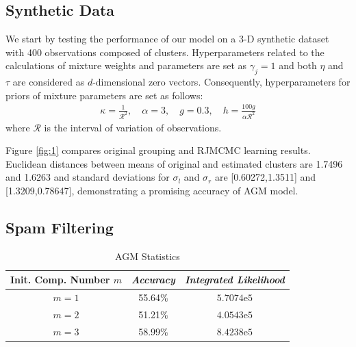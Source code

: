 \documentclass[conference]{IEEEtran}
\begin{document}
\subsection{Synthetic Data}

We start by testing the performance of our model on a 3-D synthetic dataset with 400 observations composed of clusters. Hyperparameters related to the calculations of mixture weights and parameters are set as $\gamma_j = 1$ and both $\eta$ and $\tau$ are considered as $d$-dimensional zero vectors. Consequently, hyperparameters for priors of mixture parameters are set as follows\cite{b13}:
\begin{align}
\kappa = \frac{1}{\mathcal{R}^2}, \quad \alpha = 3, \quad g=0.3, \quad h=\frac{100g}{\alpha\mathcal{R}^2}
\label{eq:hypers}
\end{align}
where $\mathcal{R}$ is the interval of variation of observations.

Figure \ref{fig:1} compares original grouping and RJMCMC learning results. Euclidean distances between means of original and estimated clusters are 1.7496 and 1.6263 and standard deviations for $\sigma_l$ and $\sigma_r$ are [0.60272,1.3511] and [1.3209,0.78647], demonstrating a promising accuracy of AGM model.

\subsection{Spam Filtering}

\begin{table}[b]
\caption{AGM Statistics}
\begin{center}
\begin{tabular}{|c|c|c|}
\hline
\multicolumn{1}{|p{2cm}|}{\centering \textbf{Init. Comp. Number $m$}} & \multicolumn{1}{|p{2cm}|}{\centering \textbf{\textit{Accuracy}}} & \multicolumn{1}{|p{2cm}|}{\centering \textbf{\textit{Integrated Likelihood}}}\\
\hline
$m=1$ & 55.64\% & $5.7074\mathrm{e}{5}$\\
$m=2$ & 51.21\% & $4.0543\mathrm{e}{5}$ \\
$m=3$ & 58.99\% & $8.4238\mathrm{e}{5}$ \\
\hline
\end{tabular}
\label{tab1}
\end{center}
\end{table}
\end{document}
